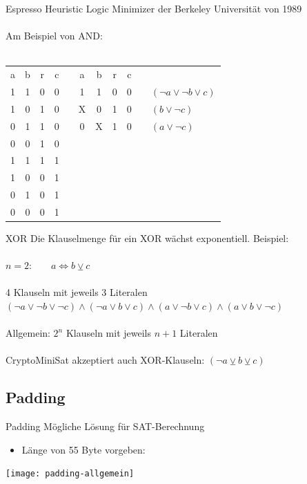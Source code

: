 \documentclass{beamer}
\begin{document}
    \begin{frame}{Espresso}
      Heuristic Logic Minimizer der Berkeley Universität von 1989\\
      ~\\
      Am Beispiel von AND:\\
      ~\\
      \begin{tabular}{ccc|cp{1cm}ccc|cp{1cm}l}
        a & b & r & c & & a & b & r & c\\
        \cline{1-4}\cline{6-9}
        1 & 1 & 0 & 0 & & 1 & 1 & 0 & 0 & & $ (\neg a \vee \neg b \vee c) $\\
        1 & 0 & 1 & 0 & & X & 0 & 1 & 0 & & $ (b \vee \neg c) $\\
        0 & 1 & 1 & 0 & & 0 & X & 1 & 0 & & $ (a \vee \neg c) $\\
        0 & 0 & 1 & 0 \\
        \cline{1-4}
        1 & 1 & 1 & 1 \\
        1 & 0 & 0 & 1 \\
        0 & 1 & 0 & 1 \\
        0 & 0 & 0 & 1 \\
      \end{tabular}
    \end{frame}
    \begin{frame}{XOR}
      Die Klauselmenge für ein XOR wächst exponentiell. Beispiel:\\
      ~\\
      $n = 2$:~~~~$ a \Leftrightarrow b \veebar c$\\
      ~\\
      4 Klauseln mit jeweils 3 Literalen
      ~\\
      $ (\neg a \vee \neg b \vee \neg c) \wedge (\neg a \vee b \vee c) \wedge (a \vee \neg b \vee c) \wedge (a \vee b \vee \neg c) $\\
      ~\\
      Allgemein: $ 2^{n} $ Klauseln mit jeweils $ n + 1 $ Literalen\\
      ~\\
      CryptoMiniSat akzeptiert auch XOR-Klauseln: $ (\neg a \veebar b \veebar c)$\\
    \end{frame}
  \subsection{Padding}
    \begin{frame}{Padding}
      Mögliche Lösung für SAT-Berechnung\\
      \begin{itemize}
       \item Länge von 55 Byte vorgeben:
      \end{itemize}
      \texttt{[image: padding-allgemein]}
    \end{frame}
\end{document}
